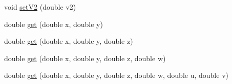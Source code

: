 \begin{DoxyCompactItemize}
\item 
void \hyperlink{classanl_1_1CImplicitGradient_abc4653e6cce60eb241f84ce78f651e92}{setV2} (double v2)
\item 
double \hyperlink{classanl_1_1CImplicitGradient_a7e580d3643f735ba73177de4919935b7}{get} (double x, double y)
\item 
double \hyperlink{classanl_1_1CImplicitGradient_ae9cba8a20bb633f73c94118d6a644d70}{get} (double x, double y, double z)
\item 
double \hyperlink{classanl_1_1CImplicitGradient_a49c3b137f2ee2a713de213d949c2c05a}{get} (double x, double y, double z, double w)
\item 
double \hyperlink{classanl_1_1CImplicitGradient_a00c49e418fae08368f1fb1a915c760e9}{get} (double x, double y, double z, double w, double u, double v)
\end{DoxyCompactItemize}
